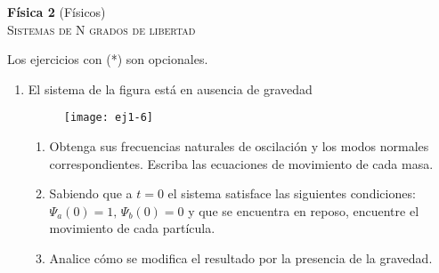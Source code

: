 \documentclass[11pt,spanish,a4paper]{article}
\begin{document}
\begin{center}
\textbf{Física 2} (Físicos) \hfill {}\\
	\textsc{\LARGE Sistemas de N grados de libertad}
\end{center}

Los ejercicios con (*) son opcionales.

\begin{enumerate}


\section*{Modos normales de oscilación}

\item El sistema de la figura está en ausencia de gravedad
\begin{figure}[h]
\centering{}\texttt{[image: ej1-6]}
\end{figure}
\begin{enumerate}
	\item Obtenga sus frecuencias naturales de oscilación y los modos normales correspondientes.
	Escriba las ecuaciones de movimiento de cada masa.
	\item Sabiendo que a $t=0$ el sistema satisface las siguientes condiciones: $\Psi_{a}(0)=1,\,\Psi_{b}(0)=0$ y que se encuentra en reposo, encuentre el movimiento de cada partícula.
	\item Analice cómo se modifica el resultado por la presencia de la gravedad.
\end{enumerate}




\end{enumerate}
\end{document}
